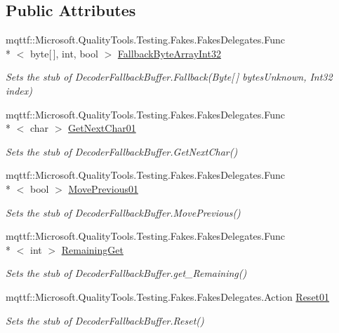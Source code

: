 \subsection*{Public Attributes}
\begin{DoxyCompactItemize}
\item 
mqttf\-::\-Microsoft.\-Quality\-Tools.\-Testing.\-Fakes.\-Fakes\-Delegates.\-Func\\*
$<$ byte\mbox{[}$\,$\mbox{]}, int, bool $>$ \hyperlink{class_system_1_1_text_1_1_fakes_1_1_stub_decoder_fallback_buffer_a5f10318d6bc814722177c36a7285818e}{Fallback\-Byte\-Array\-Int32}
\begin{DoxyCompactList}\small\item\em Sets the stub of Decoder\-Fallback\-Buffer.\-Fallback(\-Byte\mbox{[}$\,$\mbox{]} bytes\-Unknown, Int32 index)\end{DoxyCompactList}\item 
mqttf\-::\-Microsoft.\-Quality\-Tools.\-Testing.\-Fakes.\-Fakes\-Delegates.\-Func\\*
$<$ char $>$ \hyperlink{class_system_1_1_text_1_1_fakes_1_1_stub_decoder_fallback_buffer_afc0577c7dd57e61452f1a45dee67fc90}{Get\-Next\-Char01}
\begin{DoxyCompactList}\small\item\em Sets the stub of Decoder\-Fallback\-Buffer.\-Get\-Next\-Char()\end{DoxyCompactList}\item 
mqttf\-::\-Microsoft.\-Quality\-Tools.\-Testing.\-Fakes.\-Fakes\-Delegates.\-Func\\*
$<$ bool $>$ \hyperlink{class_system_1_1_text_1_1_fakes_1_1_stub_decoder_fallback_buffer_a86bc7abcad6ec1c3461fbbad0c7dcd0e}{Move\-Previous01}
\begin{DoxyCompactList}\small\item\em Sets the stub of Decoder\-Fallback\-Buffer.\-Move\-Previous()\end{DoxyCompactList}\item 
mqttf\-::\-Microsoft.\-Quality\-Tools.\-Testing.\-Fakes.\-Fakes\-Delegates.\-Func\\*
$<$ int $>$ \hyperlink{class_system_1_1_text_1_1_fakes_1_1_stub_decoder_fallback_buffer_a6ba9d359ce5161b94505829e9dfb720f}{Remaining\-Get}
\begin{DoxyCompactList}\small\item\em Sets the stub of Decoder\-Fallback\-Buffer.\-get\-\_\-\-Remaining()\end{DoxyCompactList}\item 
mqttf\-::\-Microsoft.\-Quality\-Tools.\-Testing.\-Fakes.\-Fakes\-Delegates.\-Action \hyperlink{class_system_1_1_text_1_1_fakes_1_1_stub_decoder_fallback_buffer_ae4431d799d1c0c59dd1c58fb489e7e06}{Reset01}
\begin{DoxyCompactList}\small\item\em Sets the stub of Decoder\-Fallback\-Buffer.\-Reset()\end{DoxyCompactList}\end{DoxyCompactItemize}
